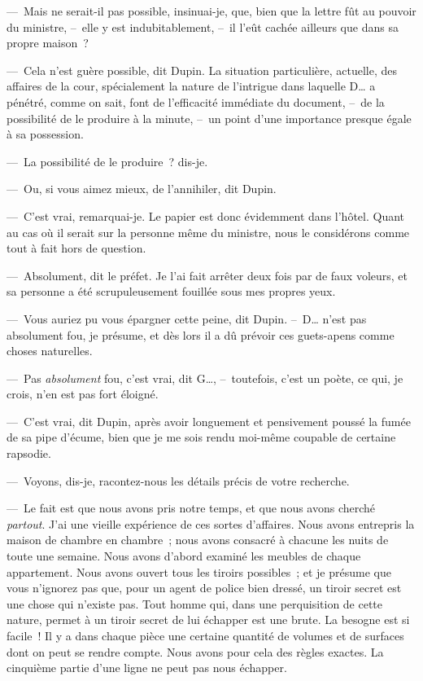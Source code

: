 \documentclass[french,twoside]{book} %
\begin{document}
— Mais ne serait-il pas possible, insinuai-je, que, bien que la lettre fût au pouvoir du ministre, – elle y est indubitablement, – il l’eût cachée ailleurs que dans sa propre maison ?\par
— Cela n’est guère possible, dit Dupin. La situation particulière, actuelle, des affaires de la cour, spécialement la nature de l’intrigue dans laquelle D… a pénétré, comme on sait, font de l’efficacité immédiate du document, – de la possibilité de le produire à la minute, – un point d’une importance presque égale à sa possession.\par
— La possibilité de le produire ? dis-je.\par
— Ou, si vous aimez mieux, de l’annihiler, dit Dupin.\par
— C’est vrai, remarquai-je. Le papier est donc évidemment dans l’hôtel. Quant au cas où il serait sur la personne même du ministre, nous le considérons comme tout à fait hors de question.\par
— Absolument, dit le préfet. Je l’ai fait arrêter deux fois par de faux voleurs, et sa personne a été scrupuleusement fouillée sous mes propres yeux.\par
— Vous auriez pu vous épargner cette peine, dit Dupin. – D… n’est pas absolument fou, je présume, et dès lors il a dû prévoir ces guets-apens comme choses naturelles.\par
— Pas\emph{ absolument} fou, c’est vrai, dit G…, – toutefois, c’est un poète, ce qui, je crois, n’en est pas fort éloigné.\par
— C’est vrai, dit Dupin, après avoir longuement et pensivement poussé la fumée de sa pipe d’écume, bien que je me sois rendu moi-même coupable de certaine rapsodie.\par
— Voyons, dis-je, racontez-nous les détails précis de votre recherche.\par
— Le fait est que nous avons pris notre temps, et que nous avons cherché \emph{partout}. J’ai une vieille expérience de ces sortes d’affaires. Nous avons entrepris la maison de chambre en chambre ; nous avons consacré à chacune les nuits de toute une semaine. Nous avons d’abord examiné les meubles de chaque appartement. Nous avons ouvert tous les tiroirs possibles ; et je présume que vous n’ignorez pas que, pour un agent de police bien dressé, un tiroir secret est une chose qui n’existe pas. Tout homme qui, dans une perquisition de cette nature, permet à un tiroir secret de lui échapper est une brute. La besogne est si facile ! Il y a dans chaque pièce une certaine quantité de volumes et de surfaces dont on peut se rendre compte. Nous avons pour cela des règles exactes. La cinquième partie d’une ligne ne peut pas nous échapper.\par
\end{document}
